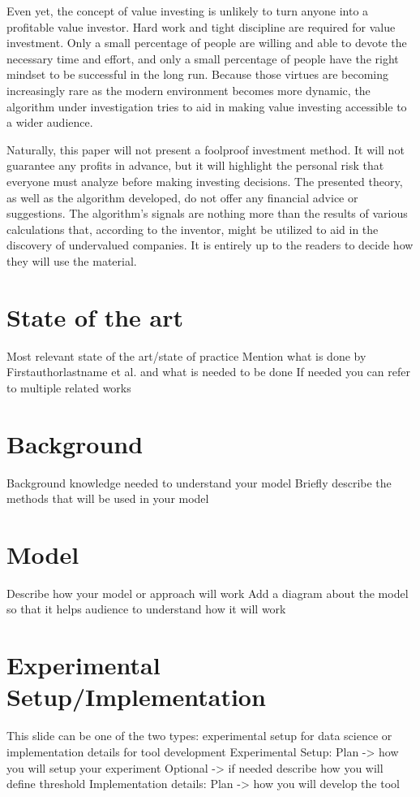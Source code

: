 \documentclass{imc-inf}
\begin{document}
Even yet, the concept of value investing is unlikely to turn anyone into a profitable value investor. Hard work and tight discipline are required for value investment. Only a small percentage of people are willing and able to devote the necessary time and effort, and only a small percentage of people have the right mindset to be successful in the long run. Because those virtues are becoming increasingly rare as the modern environment becomes more dynamic, the algorithm under investigation tries to aid in making value investing accessible to a wider audience.

Naturally, this paper will not present a foolproof investment method. It will not guarantee any profits in advance, but it will highlight the personal risk that everyone must analyze before making investing decisions. The presented theory, as well as the algorithm developed, do not offer any financial advice or suggestions. The algorithm's signals are nothing more than the results of various calculations that, according to the inventor, might be utilized to aid in the discovery of undervalued companies. It is entirely up to the readers to decide how they will use the material.


\section{State of the art}
Most relevant state of the art/state of practice
Mention what is done by Firstauthorlastname et al. and what is needed to be done
If needed you can refer to multiple related works

\section{Background}
Background knowledge needed to understand your model
Briefly describe the methods that will be used in your model

\section{Model}

Describe how your model or approach will work
Add a diagram about the model so that it helps audience to understand how it will work

\section{Experimental Setup/Implementation}
This slide can be one of the two types: experimental setup for data science or implementation details for tool development
Experimental Setup:
Plan -> how you will setup your experiment
Optional -> if needed describe how you will define threshold
Implementation details:
Plan -> how you will develop the tool
\end{document}
